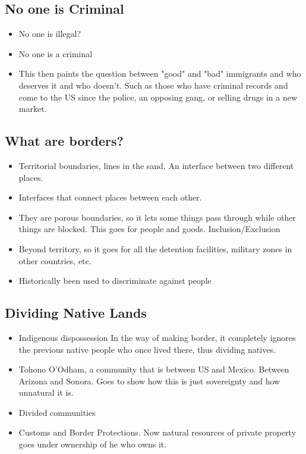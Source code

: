 \documentclass{article}
\begin{document}
\subsection{No one is Criminal}
\begin{itemize}
  \item No one is illegal?
  \item No one is a criminal
  \item This then paints the question between
    "good" and "bad" immigrants and who deserves it and who 
    doesn't. Such as those who have criminal records and come to the
    US since the police, an opposing gang, or selling drugs
    in a new market.
\end{itemize}

\subsection{What are borders?}
\begin{itemize}
  \item Territorial boundaries, lines
      in the sand. An interface between two different places.
    \item Interfaces that connect places between each other.
    \item They are porous boundaries, so it lets some things
      pass through while other things are blocked. This goes
      for people and goods. Inclusion/Exclusion
    \item Beyond territory, so it goes for all the detention facilities,
      military zones in other countries, etc.
    \item Historically been used to discriminate against people
\end{itemize}

\subsection{Dividing Native Lands}
\begin{itemize}
  \item Indigenous dispossession
    In the way of making border, it completely ignores the previous
    native people who once lived there, thus dividing natives.
  \item Tohono O'Odham, a community that is between US and Mexico.
    Between Arizona and Sonora.
    Goes to show how this is just sovereignty and how unnatural it is.
  \item Divided communities
  \item Customs and Border Protections.
    Now natural resources of private property goes under ownership
    of he who owns it.
\end{itemize}
\end{document}
